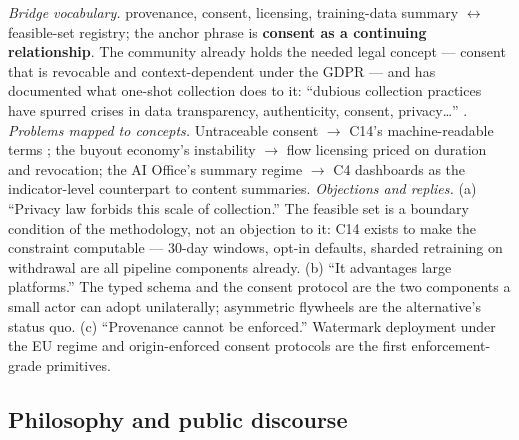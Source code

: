 \documentclass[10pt]{article}
\begin{document}
\emph{Bridge vocabulary.} provenance, consent, licensing, training-data summary $\leftrightarrow$ feasible-set registry; the anchor phrase is \textbf{consent as a continuing relationship}. The community already holds the needed legal concept --- consent that is revocable and context-dependent under the GDPR \cite{ref60} --- and has documented what one-shot collection does to it: ``dubious collection practices have spurred crises in data transparency, authenticity, consent, privacy…'' \cite{ref9}. \emph{Problems mapped to concepts.} Untraceable consent $\to$ C14's machine-readable terms \cite{ref59}; the buyout economy's instability \cite{ref10,ref63} $\to$ flow licensing priced on duration and revocation; the AI Office's summary regime \cite{ref17} $\to$ C4 dashboards as the indicator-level counterpart to content summaries. \emph{Objections and replies.} (a) ``Privacy law forbids this scale of collection.'' The feasible set is a boundary condition of the methodology, not an objection to it: C14 exists to make the constraint computable --- 30-day windows, opt-in defaults, sharded retraining on withdrawal \cite{ref61} are all pipeline components already. (b) ``It advantages large platforms.'' The typed schema and the consent protocol are the two components a small actor can adopt unilaterally; asymmetric flywheels are the alternative's status quo. (c) ``Provenance cannot be enforced.'' Watermark deployment under the EU regime \cite{ref42} and origin-enforced consent protocols are the first enforcement-grade primitives.

\subsection{Philosophy and public discourse}
\end{document}
